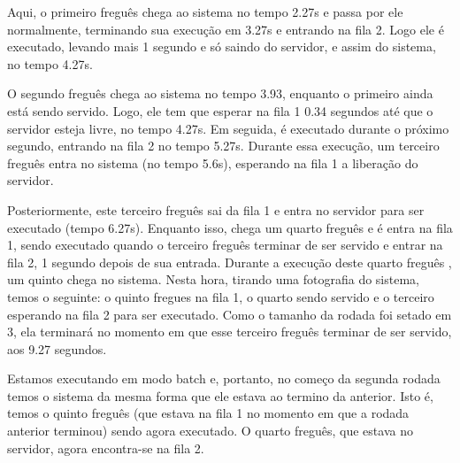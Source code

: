 \documentclass[a4paper,10pt]{article}
\begin{document}
    Aqui, o primeiro freguês chega ao sistema no tempo 2.27s e passa por ele normalmente, terminando sua execução em 3.27s e entrando na fila 2. Logo ele é executado, levando mais 1 segundo e só saindo do servidor, e assim do sistema, no tempo 4.27s.

    O segundo freguês chega ao sistema no tempo 3.93, enquanto o primeiro ainda está sendo servido. Logo, ele tem que esperar na fila 1 0.34 segundos até que o servidor esteja livre, no tempo 4.27s. Em seguida, é executado durante o próximo segundo, entrando na fila 2 no tempo 5.27s. Durante essa execução, um terceiro freguês entra no sistema (no tempo 5.6s), esperando na fila 1 a liberação do servidor.

    Posteriormente, este terceiro freguês sai da fila 1 e entra no servidor para ser executado (tempo 6.27s). Enquanto isso, chega um quarto freguês e é entra na fila 1, sendo executado quando o terceiro freguês terminar de ser servido e entrar na fila 2, 1 segundo depois de sua entrada. Durante a execução deste quarto freguês , um quinto chega no sistema. Nesta hora, tirando uma fotografia do sistema, temos o seguinte: o quinto fregues na fila 1, o quarto sendo servido e o terceiro esperando na fila 2 para ser executado. Como o tamanho da rodada foi setado em 3, ela terminará no momento em que esse terceiro freguês terminar de ser servido, aos 9.27 segundos.

    Estamos executando em modo batch e, portanto, no começo da segunda rodada temos o sistema da mesma forma que ele estava ao termino da anterior. Isto é, temos o quinto freguês (que estava na fila 1 no momento em que a rodada anterior terminou) sendo agora executado. O quarto freguês, que estava no servidor, agora encontra-se na fila 2.
\end{document}

